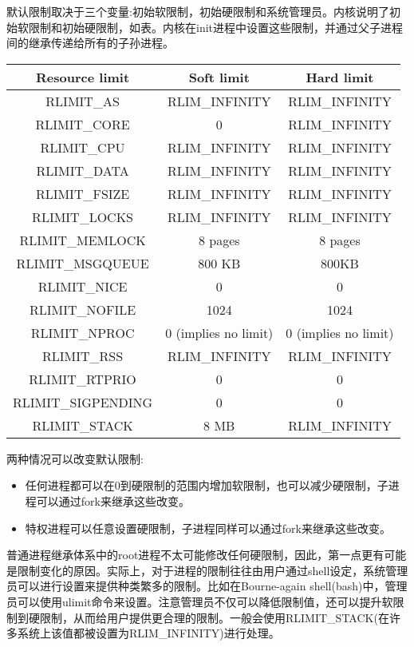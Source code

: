   默认限制取决于三个变量:初始软限制，初始硬限制和系统管理员。内核说明了初始软限制和初始硬限制，如表。内核在init进程中设置这些限制，并通过父子进程间的继承传递给所有的子孙进程。
\begin{center}
\begin{tabular}{ccc}
  \toprule [1pt]
  \rowcolor[gray]{.9}
    Resource limit & Soft limit & Hard limit\\
  \midrule
    RLIMIT\_AS & RLIM\_INFINITY & RLIM\_INFINITY\\
    RLIMIT\_CORE & 0 & RLIM\_INFINITY\\
    RLIMIT\_CPU & RLIM\_INFINITY & RLIM\_INFINITY\\
    RLIMIT\_DATA & RLIM\_INFINITY & RLIM\_INFINITY\\
    RLIMIT\_FSIZE & RLIM\_INFINITY & RLIM\_INFINITY\\
    RLIMIT\_LOCKS & RLIM\_INFINITY & RLIM\_INFINITY\\
    RLIMIT\_MEMLOCK & 8 pages & 8 pages\\
    RLIMIT\_MSGQUEUE & 800 KB & 800KB\\
    RLIMIT\_NICE & 0 & 0\\
    RLIMIT\_NOFILE & 1024 & 1024\\
    RLIMIT\_NPROC & 0 (implies no limit) & 0 (implies no limit)\\
    RLIMIT\_RSS & RLIM\_INFINITY & RLIM\_INFINITY\\
    RLIMIT\_RTPRIO & 0 & 0\\
    RLIMIT\_SIGPENDING & 0 & 0\\
    RLIMIT\_STACK & 8 MB & RLIM\_INFINITY\\
  \bottomrule[1pt]
\end{tabular}
\end{center}

  两种情况可以改变默认限制:

\begin{itemize}
\item 任何进程都可以在0到硬限制的范围内增加软限制，也可以减少硬限制，子进程可以通过fork来继承这些改变。
\item 特权进程可以任意设置硬限制，子进程同样可以通过fork来继承这些改变。
\end{itemize}

  普通进程继承体系中的root进程不太可能修改任何硬限制，因此，第一点更有可能是限制变化的原因。实际上，对于进程的限制往往由用户通过shell设定，系统管理员可以进行设置来提供种类繁多的限制。比如在Bourne-again shell(bash)中，管理员可以使用ulimit命令来设置。注意管理员不仅可以降低限制值，还可以提升软限制到硬限制，从而给用户提供更合理的限制。一般会使用RLIMIT\_STACK(在许多系统上该值都被设置为RLIM\_INFINITY)进行处理。

